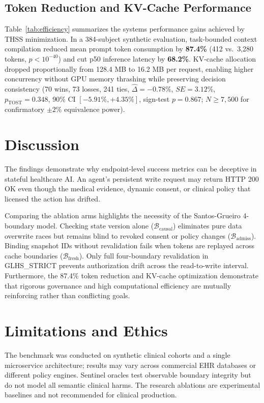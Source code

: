 \documentclass[conference,a4paper]{IEEEtran}
\begin{document}
\subsection{Token Reduction and KV-Cache Performance}
Table~\ref{tab:efficiency} summarizes the systems performance gains achieved by THSS minimization. In a 384-subject synthetic evaluation, task-bounded context compilation reduced mean prompt token consumption by \textbf{87.4\%} (412 vs.\ 3,280 tokens, $p < 10^{-40}$) and cut p50 inference latency by \textbf{68.2\%}. KV-cache allocation dropped proportionally from 128.4 MB to 16.2 MB per request, enabling higher concurrency without GPU memory thrashing while preserving decision consistency (70 wins, 73 losses, 241 ties, $\hat{\Delta} = -0.78\%$, $SE = 3.12\%$, $p_{\text{TOST}} = 0.348$, 90\% CI $[-5.91\%, +4.35\%]$, sign-test $p=0.867$; $N \ge 7{,}500$ for confirmatory $\pm 2\%$ equivalence power).

\section{Discussion}
The findings demonstrate why endpoint-level success metrics can be deceptive in stateful healthcare AI. An agent's persistent write request may return HTTP 200 OK even though the medical evidence, dynamic consent, or clinical policy that licensed the action has drifted. 

Comparing the ablation arms highlights the necessity of the Santos-Grueiro 4-boundary model. Checking state version alone ($\mathcal{B}_{\text{causal}}$) eliminates pure data overwrite races but remains blind to revoked consent or policy changes ($\mathcal{B}_{\text{admiss}}$). Binding snapshot IDs without revalidation fails when tokens are replayed across cache boundaries ($\mathcal{B}_{\text{fresh}}$). Only full four-boundary revalidation in GLHS\_STRICT prevents authorization drift across the read-to-write interval. Furthermore, the 87.4\% token reduction and KV-cache optimization demonstrate that rigorous governance and high computational efficiency are mutually reinforcing rather than conflicting goals.

\section{Limitations and Ethics}
The benchmark was conducted on synthetic clinical cohorts and a single microservice architecture; results may vary across commercial EHR databases or different policy engines. Sentinel oracles test observable boundary integrity but do not model all semantic clinical harms. The research ablations are experimental baselines and not recommended for clinical production.
\end{document}
